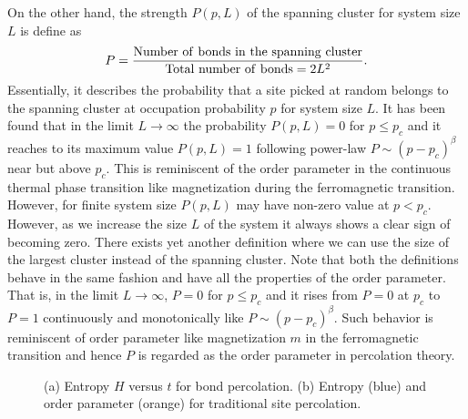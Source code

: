 \documentclass[twocolumn,showpacs,preprintnumbers,amsmath,amssymb]{article}
\begin{document}
On the other hand, the strength $P(p,L)$ of the spanning cluster for system size $L$
is define as 
\begin{equation}
\label{eq:pp1}
P={{{\rm Number \ of \ bonds \ in \ the \ spanning \ cluster}}\over{{\rm Total \ 
number \ of \ bonds }=2L^2}}.
\end{equation}
Essentially, it describes the probability that a site 
picked at random belongs to the spanning cluster at occupation probability $p$ for system size $L$.
It has been found that in the limit $L\rightarrow \infty$ the probability $P(p,L)=0$ 
for $p\leq p_c$ and it reaches to its maximum value $P(p,L)=1$ 
following power-law $P\sim (p-p_c)^\beta$ near but above $p_c$. This is reminiscent 
of the order parameter in the continuous thermal phase transition like magnetization
during the ferromagnetic transition.  However, for finite system size $P(p,L)$ may have non-zero
value at $p<p_c$. However, as we increase the size $L$ of the system it always shows a clear sign
of becoming zero. There exists yet another definition where 
we can use the size of the largest cluster instead of the spanning cluster. Note that both the definitions 
behave in the same fashion and have all the properties of the order parameter. That is,  
in the limit $L\rightarrow \infty$, 
$P=0$ for $p\leq p_c$ and it rises from $P=0$ at $p_c$ to $P=1$ continuously and monotonically like $P\sim (p-p_c)^\beta$. 
Such behavior is reminiscent of order parameter like magnetization $m$ in the ferromagnetic transition and
hence $P$ is regarded as the order parameter in percolation theory. 



\begin{figure}

\centering




\subfloat[]
{
\label{fig:1a}
}


\subfloat[]
{
\label{fig:1b}
}

\caption{(a) Entropy $H$ versus $t$ for bond percolation. (b) Entropy (blue) and order parameter (orange) 
for traditional site percolation. 
} 

\label{fig:1ab}
\end{figure}
\end{document}
